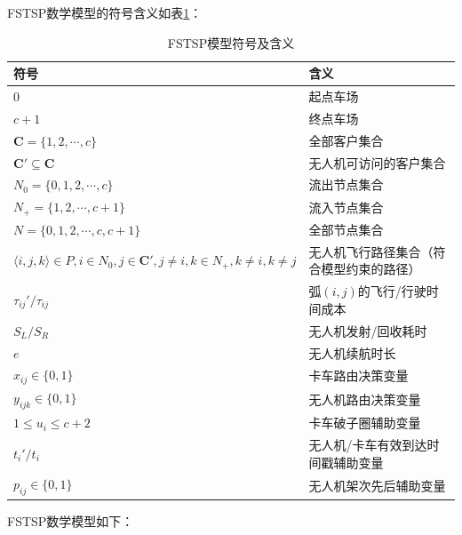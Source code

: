 FSTSP数学模型的符号含义如表\ref{tab:fstsp-sign-meaning}：

\begin{table}[!htbp]
    \centering
    \caption{FSTSP模型符号及含义}
    \label{tab:fstsp-sign-meaning}
    \begin{tabularx}{\textwidth}{lX}
        \toprule[1pt] %
        符号 & 含义 \\
        \midrule[0.75pt] %
        $0$ & 起点车场 \\
        $c + 1$ & 终点车场 \\
        $\mathbf{C}=\{1,2,\cdots,c\}$ & 全部客户集合 \\
        $\mathbf{C}' \subseteq \mathbf{C}$ & 无人机可访问的客户集合 \\
        $N_0 = \{0,1,2,\cdots,c\}$ & 流出节点集合 \\
        $N_+ = \{1,2,\cdots,c + 1\}$ & 流入节点集合 \\
        $N = \{0,1,2,\cdots,c,c + 1\}$ & 全部节点集合 \\
        $\langle i,j,k\rangle \in P, i \in N_0, j \in \mathbf{C}', j \neq i, k \in N_+, k \neq i, k \neq j$ & 无人机飞行路径集合（符合模型约束的路径） \\
        $\tau_{ij}'/\tau_{ij}$ & 弧$(i,j)$的飞行/行驶时间成本 \\
        $S_L/S_R$ & 无人机发射/回收耗时 \\
        $e$ & 无人机续航时长 \\
        $x_{ij} \in \{0,1\}$ & 卡车路由决策变量 \\
        $y_{ijk} \in \{0,1\}$ & 无人机路由决策变量 \\
        $1 \leq u_i \leq c + 2$ & 卡车破子圈辅助变量 \\
        $t_i'/t_i$ & 无人机/卡车有效到达时间戳辅助变量 \\
        $p_{ij} \in \{0,1\}$ & 无人机架次先后辅助变量 \\
        \bottomrule[1pt] %
    \end{tabularx}
\end{table}

FSTSP数学模型如下：

